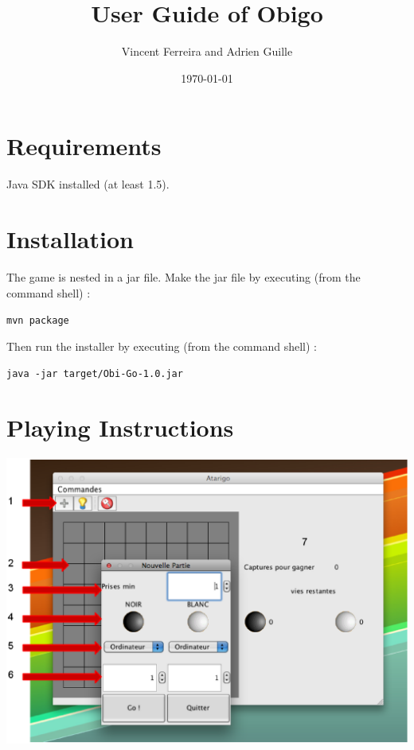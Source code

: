 \documentclass[a4paper]{ltxguide}
\title{User Guide of Obigo}
\author{Vincent Ferreira and Adrien Guille}
\date{\today}
\begin{document}
\maketitle
\tableofcontents

\section{Requirements}

Java SDK installed (at least 1.5).

\section{Installation}

The game is nested in a jar file.
Make the jar file by executing (from the command shell) :

\begin{center}
\texttt{mvn package}
\end{center}
Then run the installer by executing (from the command shell) :

\begin{center}
\texttt{java -jar target/Obi-Go-1.0.jar}
\end{center}
\section{Playing Instructions}

\begin{center}
	\includegraphics[scale=0.50]{capture}
\end{center}
\end{document}
